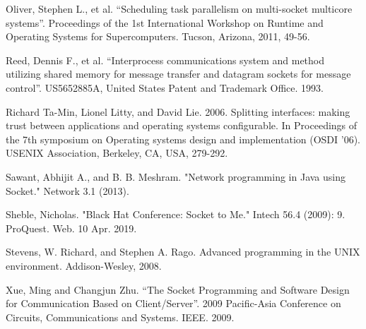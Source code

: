 \documentclass[conference, 12pt]{IEEEtran}
\begin{document}
\begin{thebibliography}{00}
Oliver, Stephen L., et al. “Scheduling task parallelism on multi-socket multicore systems”. Proceedings of the 1st International Workshop on Runtime and Operating Systems for Supercomputers. Tucson, Arizona, 2011, 49-56.
     
Reed, Dennis F., et al. “Interprocess communications system and method utilizing shared memory for message transfer and datagram sockets for message control”. US5652885A, United States Patent and Trademark Office. 1993.
     
Richard Ta-Min, Lionel Litty, and David Lie. 2006. Splitting interfaces: making trust between applications and operating systems configurable. In Proceedings of the 7th symposium on Operating systems design and implementation (OSDI '06). USENIX Association, Berkeley, CA, USA, 279-292.
     
Sawant, Abhijit A., and B. B. Meshram. "Network programming in Java using Socket." Network 3.1 (2013).
     
Sheble, Nicholas. "Black Hat Conference: Socket to Me." Intech 56.4 (2009): 9. ProQuest. Web. 10 Apr. 2019.
     
Stevens, W. Richard, and Stephen A. Rago. Advanced programming in the UNIX environment. Addison-Wesley, 2008.
     
Xue, Ming and Changjun Zhu. “The Socket Programming and Software Design for Communication Based on Client/Server”. 2009 Pacific-Asia Conference on Circuits, Communications and Systems. IEEE. 2009.    
\end{thebibliography}
\end{document}
